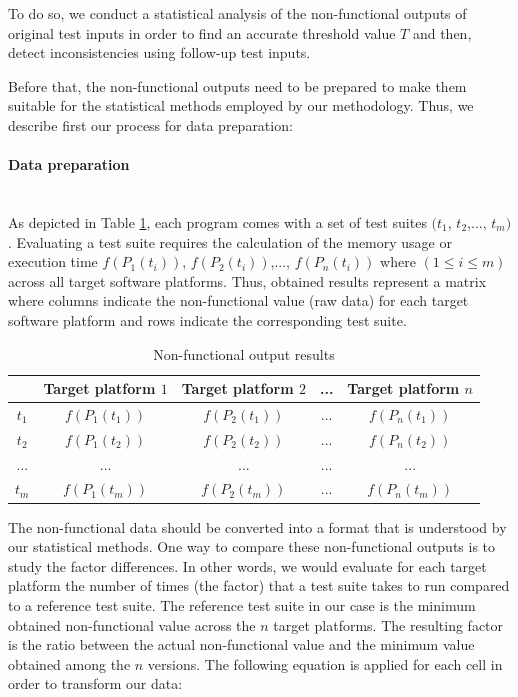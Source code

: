 To do so, we conduct a statistical analysis of the non-functional outputs of original test inputs in order to find an accurate threshold value $T$ and then, detect inconsistencies using follow-up test inputs.
 
Before that, the non-functional outputs need to be prepared to make them suitable for the statistical methods employed by our methodology. Thus, we describe first our process for data preparation:

\paragraph{Data preparation}~\\ 
As depicted in Table \ref{tab:Non-functional output results}, each program comes with a set of test suites $(t_{1}$, $t_{2}$,..., $t_{m})$. Evaluating a test suite requires the calculation of the memory usage or execution time $f(P_{1}(t_{i}))$,  $f(P_{2}(t_{i}))$,..., $f(P_{n}(t_{i}))$ where $(1 \leq i \leq m)$  across all target software platforms. Thus, obtained results represent a matrix where columns indicate the non-functional value (raw data) for each target software platform and rows indicate the corresponding test suite.
\begin{table}[h]
	\centering
	
	\begin{tabular}{|c| c |c |c| c|}				
		\hline

		 &  Target platform $1$ &  Target platform $2$ & ... & Target platform $n$  \\ \hline
		$t_{1}$  &  $f(P_{1}(t_{1}))$ &  $f(P_{2}(t_{1}))$ & ... & $f(P_{n}(t_{1}))$  \\ \hline
		$t_{2}$ &  $f(P_{1}(t_{2}))$ &  $f(P_{2}(t_{2}))$ & ... & $f(P_{n}(t_{2}))$  \\ \hline
		... &  ... &  ... & ... & ...  \\ \hline
		$t_{m}$ &  $f(P_{1}(t_{m}))$ &  $f(P_{2}(t_{m}))$ & ... & $f(P_{n}(t_{m}))$  \\ \hline
	\end{tabular}
	
	\caption{Non-functional output results}
	\label{tab:Non-functional output results}
\end{table}
The non-functional data should be converted into a format that is understood by our statistical methods. One way to compare these non-functional outputs is to study the factor differences. In other words, we would evaluate for each target platform the number of times (the factor) that a test suite takes to run compared to a reference test suite. The reference test suite in our case is the minimum obtained non-functional value across the $n$ target platforms. The resulting factor is the ratio between the actual non-functional value and the minimum value obtained among the $n$ versions. The following equation is applied for each cell in order to transform our data:

